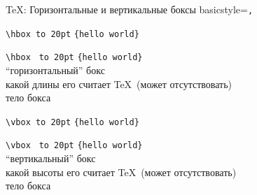 \begin{frame}[fragile]{\TeX : Горизонтальные и вертикальные боксы}\relax
     \lstset
    {
        basicstyle=\tt\normalsize,
    }
     \begin{tabbing}
     
        \lstinline|\hbox |\= \lstinline|to 20pt| \= \lstinline|{hello world}|\kill

        \lstinline|\hbox |\> \lstinline|to 20pt| \> \lstinline|{hello world}| \\ \footnotesize
        ``горизонтальный'' бокс\>  \>   \\ 
        \>\footnotesize какой длины его считает \TeX\ (может отсутствовать)  \>  \\ 
        \>  \>\footnotesize тело бокса \\
        
    \end{tabbing}
    
    \begin{tabbing}
     
        \lstinline|\vbox |\= \lstinline|to 20pt| \= \lstinline|{hello world}|\kill

        \lstinline|\vbox |\> \lstinline|to 20pt| \> \lstinline|{hello world}| \\ \footnotesize
        ``вертикальный'' бокс\>  \>   \\ 
        \>\footnotesize какой высоты его считает \TeX\ (может отсутствовать)  \>  \\ 
        \>  \>\footnotesize тело бокса \\
        
    \end{tabbing}
\end{frame}

\cprotect{}


